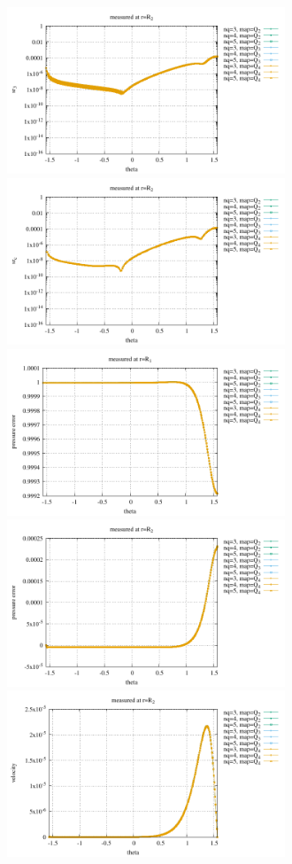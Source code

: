 \begin{center}
\includegraphics[width=8.3cm]{python_codes/fieldstone_152/results/exp2_axisymmetric/sr3_R2}
\includegraphics[width=8.3cm]{python_codes/fieldstone_152/results/exp2_axisymmetric/src_R2}\\
\includegraphics[width=8.3cm]{python_codes/fieldstone_152/results/exp2_axisymmetric/qqq_R1}
\includegraphics[width=8.3cm]{python_codes/fieldstone_152/results/exp2_axisymmetric/qqq_R2}\\
\includegraphics[width=8.3cm]{python_codes/fieldstone_152/results/exp2_axisymmetric/vel_R2}

\end{center}

